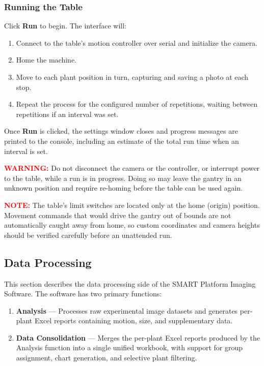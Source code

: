 \documentclass[12pt,a4paper,oneside]{report}
\begin{document}
\subsubsection*{Running the Table}

Click \textbf{Run} to begin. The interface will:

\begin{enumerate}
    \item Connect to the table's motion controller over serial and initialize the camera.
    \item Home the machine.
    \item Move to each plant position in turn, capturing and saving a photo at each stop.
    \item Repeat the process for the configured number of repetitions, waiting between repetitions if an interval was set.
\end{enumerate}

Once \textbf{Run} is clicked, the settings window closes and progress messages are printed to the console, including an estimate of the total run time when an interval is set.

\vspace{0.5cm}

\noindent
\textcolor{red}{\textbf{WARNING:}}
Do not disconnect the camera or the controller, or interrupt power to the table, while a run is in progress. Doing so may leave the gantry in an unknown position and require re-homing before the table can be used again.

\vspace{0.5cm}

\noindent
\textcolor{red}{\textbf{NOTE:}}
The table's limit switches are located only at the home (origin) position. Movement commands that would drive the gantry out of bounds are not automatically caught away from home, so custom coordinates and camera heights should be verified carefully before an unattended run.

\subsection{Data Processing}

This section describes the data processing side of the SMART Platform Imaging Software. The software has two primary functions:

\begin{enumerate}
    \item \textbf{Analysis} --- Processes raw experimental image datasets and generates per-plant Excel reports containing motion, size, and supplementary data.
    \item \textbf{Data Consolidation} --- Merges the per-plant Excel reports produced by the Analysis function into a single unified workbook, with support for group assignment, chart generation, and selective plant filtering.
\end{enumerate}
\end{document}
